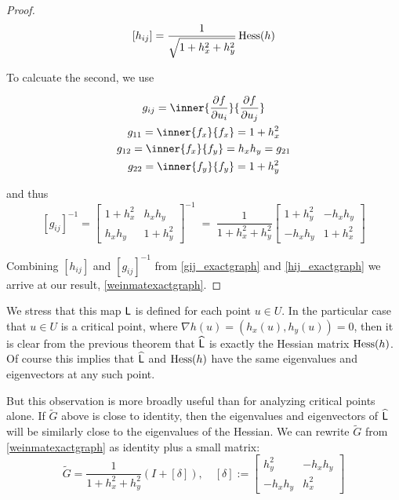 \begin{proof}
	 \begin{equation} \label{hij_exactgraph}
	 [h_{ij}] = \frac{1}{\sqrt{1+h_x^2 + h_y^2}} \,  \mathrm{Hess} (h)
	 \end{equation}
	 
	 To calcuate the second, we use
	 
	 
	 
	 \begin{equation}
	 \begin{gathered}
	 g_{ij} = \inner{\frac{\partial f}{\partial u_i}}{\frac{\partial f}{\partial u_j}} \\
	 g_{11} = \inner{f_x}{f_x} = 1 + h_x^2 \\
	 g_{12} = \inner{f_x}{f_y} = h_x h_y = g_{21} \\
	 g_{22} = \inner{f_y}{f_y} = 1 + h_y^2
	 \end{gathered}
	 \end{equation}
	 
	 and thus
		\begin{equation} \label{gij_exactgraph}		 
		[g_{ij}]^{-1} = \begin{bmatrix} 1 + h_x^2 & h_x h_y \\
					h_x h_y & 1 + h_y^2 \end{bmatrix}^{-1}
					\;=\;	\frac{1}{1+h_x^2 +h_y^2}
					\begin{bmatrix} 1 + h_y^2 & -h_x h_y \\
					-	h_x h_y & 1 + h_x^2 \end{bmatrix}
		\end{equation}
       	
       	Combining $[h_{ij}]$ and $[g_{ij}]^{-1}$ from \cref{gij_exactgraph} and \cref{hij_exactgraph}
       	we arrive at our result, \cref{weinmatexactgraph}.
       	\end{proof}
       	
  We stress that this map $\mathsf{L}$ is defined for each point $u \in U$.
  In the particular case that $u \in  U$ is a critical point, where $\nabla h(u) = (h_x(u), h_y(u)) = 0$, then it is clear from the previous theorem that $\widehat{\mathsf{L}}$ is exactly the Hessian matrix $\mathrm{Hess}(h)$. Of course this implies that $\widehat{\mathsf{L}}$ and $\mathrm{Hess}{(h)}$ have the same eigenvalues and eigenvectors at any such point.
  
But this observation is more broadly useful than for analyzing critical points alone. If $\tilde{G}$ above is close to identity, then the eigenvalues and eigenvectors of $\widehat{\mathsf{L}}$ will be similarly close to the eigenvalues of the Hessian. We can rewrite $\tilde{G}$ from \cref{weinmatexactgraph} as identity plus a small matrix:
\begin{equation}
\tilde{G} = \frac{1}{1+h_x^2 +h_y^2}\left(I + [\delta]\right), \quad
	[\delta] 	:= \begin{bmatrix} h_y^2 & -h_x h_y \\
					  -h_x h_y & h_x^2 \end{bmatrix}
\end{equation}


